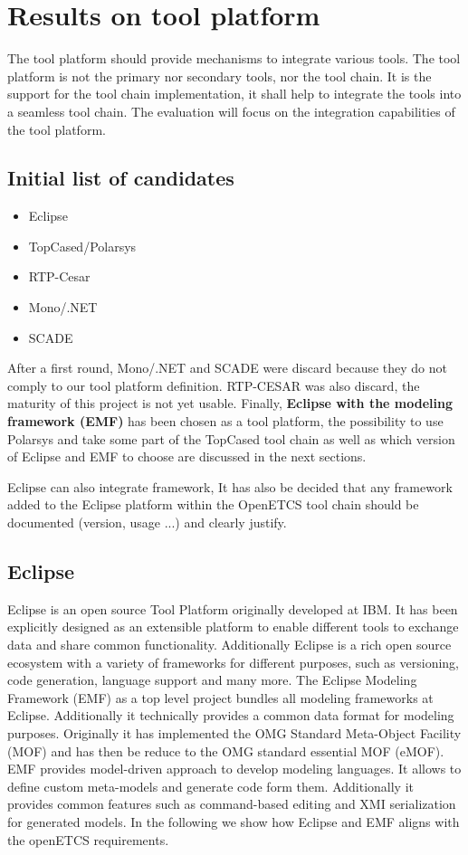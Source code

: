 
\chapter{Results on tool platform}
The tool platform should provide mechanisms to integrate various
tools. The tool platform is not the primary nor secondary tools, nor
the tool chain. It is the support for the tool chain implementation,
it shall help to integrate the tools into a seamless tool chain.
The evaluation will focus on the integration capabilities of the tool platform.

\section{Initial list of candidates}
\begin{itemize}
\item Eclipse 
\item TopCased/Polarsys
\item RTP-Cesar
\item Mono/.NET 
\item SCADE
\end{itemize}

After a first round, Mono/.NET and SCADE were discard because they do
not comply to our tool platform definition.  RTP-CESAR was also
discard, the maturity of this project is not yet usable. Finally,
{\bf Eclipse with the modeling framework (EMF)} has been chosen as a tool
platform, the possibility to use Polarsys and take some part of the
TopCased tool chain as well as which version of Eclipse  and EMF to choose are
discussed in the next sections.  

Eclipse can also integrate framework, It has also be decided that any
framework added to the Eclipse platform within the OpenETCS tool chain
should be documented (version, usage ...) and clearly justify.

\section{Eclipse}
Eclipse is an open source Tool Platform originally developed at
IBM. It has been explicitly designed as an extensible platform to
enable different tools to exchange data and share common
functionality. Additionally Eclipse is a rich open source ecosystem
with a variety of frameworks for different purposes, such as
versioning, code generation, language support and many more. The
Eclipse Modeling Framework (EMF) as a top level project bundles all
modeling frameworks at Eclipse. Additionally it technically provides a
common data format for modeling purposes. Originally it has
implemented the OMG Standard Meta-Object Facility (MOF) and has then
be reduce to the OMG standard essential MOF (eMOF). EMF provides
model-driven approach to develop modeling languages. It allows to
define custom meta-models and generate code form them. Additionally it
provides common features such as command-based editing and XMI
serialization for generated models. In the following we show how
Eclipse and EMF aligns with the openETCS requirements.

